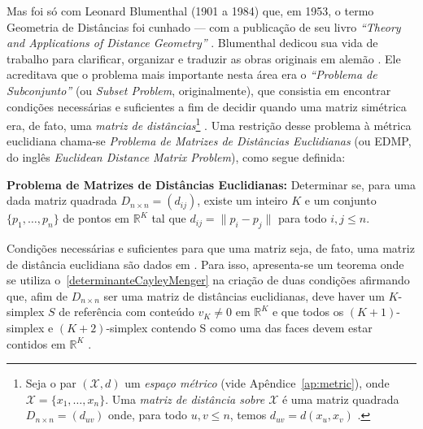 \documentclass[a4paper,12pt]{article}
\begin{document}
Mas foi só com Leonard Blumenthal (1901 a 1984) que, em 1953, o termo Geometria de Distâncias foi cunhado --- com a publicação de seu livro \textit{``Theory and Applications of Distance Geometry''} \cite{Blumenthal:53}.
Blumenthal dedicou sua vida de trabalho para clarificar, organizar e traduzir as obras originais em alemão \cite{libertiEDG}. Ele acreditava que o problema mais importante nesta área era o \textit{``Problema de Subconjunto''} (ou \textit{Subset Problem}, originalmente), que consistia em encontrar condições necessárias e suficientes a fim de decidir quando uma matriz simétrica era, de fato, uma \textit{matriz de distâncias}\footnote{Seja o par $(\mathcal{X}, d)$ um \textit{espaço métrico} (vide Apêndice~\ref{ap:metric}), onde $\mathcal{X} = \{x_1, \dots, x_n\}$. Uma \textit{matriz de distância sobre $\mathcal{X}$} é uma matriz quadrada $D_{n\times n} = (d_{uv})$ onde, para todo $u,v \leq n$, temos $d_{uv} = d(x_u,x_v)$ \cite{carlileGDandAplications}.} \cite{carlileGDandAplications}. Uma restrição desse problema à métrica euclidiana chama-se \textit{Problema de Matrizes de Distâncias Euclidianas} (ou EDMP, do inglês \textit{Euclidean Distance Matrix Problem}), como segue definida:

\begin{center}
	\begin{minipage}{0.9 \linewidth}
		\textbf{Problema de Matrizes de Distâncias Euclidianas:} Determinar se, para uma dada matriz quadrada $D_{n\times n} = (d_{ij})$, existe um inteiro $K$ e um conjunto $\{p_1, \dots, p_n \}$ de pontos em $\mathbb{R}^K$ tal que $d_{ij} = \lVert p_i - p_j\rVert$ para todo $i,j \leq n$.
	\end{minipage}
\end{center} 

Condições necessárias e suficientes para que uma matriz seja, de fato, uma matriz de distância euclidiana são dados em \cite{EDMPResolucao}. Para isso, apresenta-se um teorema onde se utiliza o~\ref{determinanteCayleyMenger} na criação de duas condições afirmando que, afim de $D_{n\times n}$ ser uma matriz de distâncias euclidianas, deve haver um $K$-simplex $S$ de referência com conteúdo $v_K \neq 0$ em $\mathbb{R}^K$ e que todos os $(K+1)$-simplex e $(K+2)$-simplex contendo S como uma das faces devem estar contidos em $\mathbb{R}^K$ \cite{carlileGDandAplications}.

\newpage
{}
{}



\end{document}
